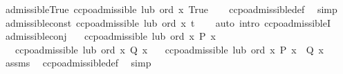 \begin{isabellebody}
%
\endisatagproof
{\isafoldproof}%
%
\isadelimproof
\isanewline
%
\endisadelimproof
\isanewline
{}\isamarkupfalse%
\ admissible{\isacharunderscore}{\kern0pt}True{\isacharcolon}{\kern0pt}\ {\isachardoublequoteopen}ccpo{\isachardot}{\kern0pt}admissible\ lub\ ord\ {\isacharparenleft}{\kern0pt}{\isasymlambda}x{\isachardot}{\kern0pt}\ True{\isacharparenright}{\kern0pt}{\isachardoublequoteclose}\isanewline
%
\isadelimproof
\ \ %
\endisadelimproof
%
\isatagproof
{}\isamarkupfalse%
\ ccpo{\isachardot}{\kern0pt}admissible{\isacharunderscore}{\kern0pt}def\ \isamarkupfalse%
\ simp%
\endisatagproof
{\isafoldproof}%
%
\isadelimproof
\isanewline
%
\endisadelimproof
\isanewline
\isanewline
{}\isamarkupfalse%
\ admissible{\isacharunderscore}{\kern0pt}const{\isacharcolon}{\kern0pt}\ {\isachardoublequoteopen}ccpo{\isachardot}{\kern0pt}admissible\ lub\ ord\ {\isacharparenleft}{\kern0pt}{\isasymlambda}x{\isachardot}{\kern0pt}\ t{\isacharparenright}{\kern0pt}{\isachardoublequoteclose}\isanewline
%
\isadelimproof
\ \ %
\endisadelimproof
%
\isatagproof
{}\isamarkupfalse%
\ {\isacharparenleft}{\kern0pt}auto\ intro{\isacharcolon}{\kern0pt}\ ccpo{\isachardot}{\kern0pt}admissibleI{\isacharparenright}{\kern0pt}%
\endisatagproof
{\isafoldproof}%
%
\isadelimproof
\isanewline
%
\endisadelimproof
\isanewline
{}\isamarkupfalse%
\ admissible{\isacharunderscore}{\kern0pt}conj{\isacharcolon}{\kern0pt}\isanewline
\ \ \ {\isachardoublequoteopen}ccpo{\isachardot}{\kern0pt}admissible\ lub\ ord\ {\isacharparenleft}{\kern0pt}{\isasymlambda}x{\isachardot}{\kern0pt}\ P\ x{\isacharparenright}{\kern0pt}{\isachardoublequoteclose}\isanewline
\ \ \ {\isachardoublequoteopen}ccpo{\isachardot}{\kern0pt}admissible\ lub\ ord\ {\isacharparenleft}{\kern0pt}{\isasymlambda}x{\isachardot}{\kern0pt}\ Q\ x{\isacharparenright}{\kern0pt}{\isachardoublequoteclose}\isanewline
\ \ \ {\isachardoublequoteopen}ccpo{\isachardot}{\kern0pt}admissible\ lub\ ord\ {\isacharparenleft}{\kern0pt}{\isasymlambda}x{\isachardot}{\kern0pt}\ P\ x\ {\isasymand}\ Q\ x{\isacharparenright}{\kern0pt}{\isachardoublequoteclose}\isanewline
%
\isadelimproof
\ \ %
\endisadelimproof
%
\isatagproof
{}\isamarkupfalse%
\ assms\ \isamarkupfalse%
\ ccpo{\isachardot}{\kern0pt}admissible{\isacharunderscore}{\kern0pt}def\ \isamarkupfalse%
\ simp%
\endisatagproof
{\isafoldproof}%
%
\isadelimproof
\isanewline
%
\endisadelimproof
\isanewline
{}\isamarkupfalse%

\end{isabellebody}
